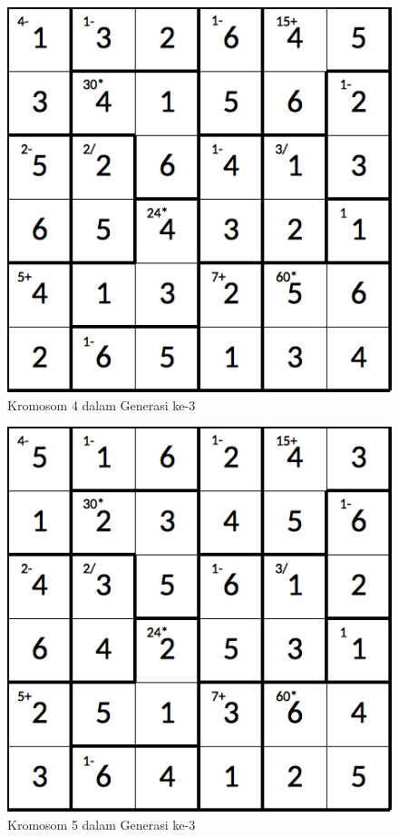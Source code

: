 \documentclass[a4paper,twoside]{article}
\begin{document}
\begin{enumerate}
\begin{figure}
\centering
\captionsetup{justification=centering}
\includegraphics[scale=0.333]{Gambar/hybridgenetic/Generation3Chromosome4}
\caption[Kromosom 4 dalam Generasi ke-3]{Kromosom 4 dalam Generasi ke-3}
\label{fig:analisisg3k4}
\end{figure}

\begin{figure}
\centering
\captionsetup{justification=centering}
\includegraphics[scale=0.333]{Gambar/hybridgenetic/Generation3Chromosome5}
\caption[Kromosom 5 dalam Generasi ke-3]{Kromosom 5 dalam Generasi ke-3}
\label{fig:analisisg3k5}
\end{figure}


\end{enumerate}
\end{document}
